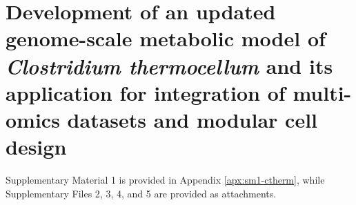 \chapter{Development of an updated genome-scale metabolic model of \textit{Clostridium thermocellum} and its application for integration of multi-omics datasets and modular cell design} \label{ch:ctherm}

Supplementary Material 1 is provided in Appendix \ref{apx:sm1-ctherm}, while Supplementary Files 2, 3, 4, and 5 are provided as attachments.


\makeatletter
\newcommand\ko[1]{{\@for\tmp:=#1\do{\textit{$\Delta$\tmp}}}}
\makeatother

\newcommand\pFBA{\mathrm{pFBA}}
\newcommand\FVA{\mathrm{FVA}}
\renewcommand\sim{\mathrm{sim}}
\newcommand\meas{\mathrm{meas}}
\newcommand\FC{\mathit{FC}}

